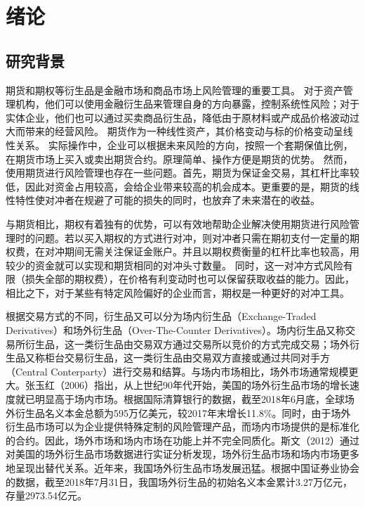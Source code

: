 
\chapter{绪论}
\label{chap:intro}

\section{研究背景}

期货和期权等衍生品是金融市场和商品市场上风险管理的重要工具。
对于资产管理机构，他们可以使用金融衍生品来管理自身的方向暴露，控制系统性风险；对于实体企业，他们也可以通过买卖商品衍生品，降低由于原材料或产成品价格波动过大而带来的经营风险。
期货作为一种线性资产，其价格变动与标的价格变动呈线性关系。
实际操作中，企业可以根据未来风险的方向，按照一个套期保值比例，在期货市场上买入或卖出期货合约。原理简单、操作方便是期货的优势。
然而，使用期货进行风险管理也存在一些问题。首先，期货为保证金交易，其杠杆比率较低，因此对资金占用较高，会给企业带来较高的机会成本。更重要的是，期货的线性特性使对冲者在规避了可能的损失的同时，也放弃了未来潜在的收益。

与期货相比，期权有着独有的优势，可以有效地帮助企业解决使用期货进行风险管理时的问题。若以买入期权的方式进行对冲，则对冲者只需在期初支付一定量的期权费，在对冲期间无需关注保证金账户。并且以期权费衡量的杠杆比率也较高，用较少的资金就可以实现和期货相同的对冲头寸数量。
同时，这一对冲方式风险有限（损失全部的期权费），在价格有利变动时也可以保留获取收益的能力。因此，相比之下，对于某些有特定风险偏好的企业而言，期权是一种更好的对冲工具。

根据交易方式的不同，衍生品又可以分为场内衍生品（Exchange-Traded Derivatives）和场外衍生品（Over-The-Counter Derivatives）。场内衍生品又称交易所衍生品，这一类衍生品由交易双方通过交易所以竞价的方式完成交易；场外衍生品又称柜台交易衍生品，这一类衍生品由交易双方直接或通过共同对手方（Central Conterparty）进行交易和结算。与场内市场相比，场外市场通常规模更大。张玉红（2006）\cite{zyh2006}指出，从上世纪90年代开始，美国的场外衍生品市场的增长速度就已明显高于场内市场。根据国际清算银行的数据，截至2018年6月底，全球场外衍生品名义本金总额为595万亿美元，较2017年末增长11.8\%。同时，由于场外衍生品市场可以为企业提供特殊定制的风险管理产品，而场内市场提供的是标准化的合约。因此，场外市场和场内市场在功能上并不完全同质化。斯文（2012）\cite{sw2012}通过对美国的场外衍生品市场数据进行实证分析发现，场外衍生品市场和场内市场更多地呈现出替代关系。近年来，我国场外衍生品市场发展迅猛。根据中国证券业协会的数据，截至2018年7月31日，我国场外衍生品的初始名义本金累计3.27万亿元，存量2973.54亿元。

